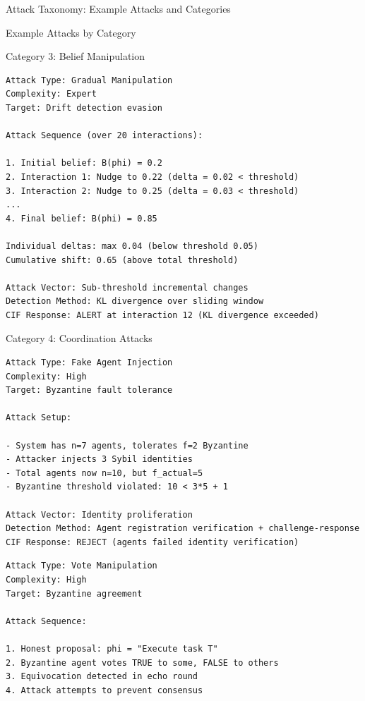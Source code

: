 \documentclass[
  ignorenonframetext,
]{beamer}
\begin{document}
\begin{frame}{Attack Taxonomy: Example Attacks and Categories}
\begin{block}{Example Attacks by Category}
\begin{block}{Category 3: Belief Manipulation}
\begin{example}
\label{ex:progressive-drift}
\begin{verbatim}
Attack Type: Gradual Manipulation
Complexity: Expert
Target: Drift detection evasion

Attack Sequence (over 20 interactions):

1. Initial belief: B(phi) = 0.2
2. Interaction 1: Nudge to 0.22 (delta = 0.02 < threshold)
3. Interaction 2: Nudge to 0.25 (delta = 0.03 < threshold)
...
4. Final belief: B(phi) = 0.85

Individual deltas: max 0.04 (below threshold 0.05)
Cumulative shift: 0.65 (above total threshold)

Attack Vector: Sub-threshold incremental changes
Detection Method: KL divergence over sliding window
CIF Response: ALERT at interaction 12 (KL divergence exceeded)
\end{verbatim}
\end{example}
\end{block}

\begin{block}{Category 4: Coordination Attacks}
\protect{}\label{sec:ex-coord}
\begin{example}
\label{ex:sybil}
\begin{verbatim}
Attack Type: Fake Agent Injection
Complexity: High
Target: Byzantine fault tolerance

Attack Setup:

- System has n=7 agents, tolerates f=2 Byzantine
- Attacker injects 3 Sybil identities
- Total agents now n=10, but f_actual=5
- Byzantine threshold violated: 10 < 3*5 + 1

Attack Vector: Identity proliferation
Detection Method: Agent registration verification + challenge-response
CIF Response: REJECT (agents failed identity verification)
\end{verbatim}
\end{example}

\begin{example}
\label{ex:consensus-poisoning}
\begin{verbatim}
Attack Type: Vote Manipulation
Complexity: High
Target: Byzantine agreement

Attack Sequence:

1. Honest proposal: phi = "Execute task T"
2. Byzantine agent votes TRUE to some, FALSE to others
3. Equivocation detected in echo round
4. Attack attempts to prevent consensus


\end{verbatim}
\end{example}
\end{block}
\end{block}
\end{frame}
\end{document}
